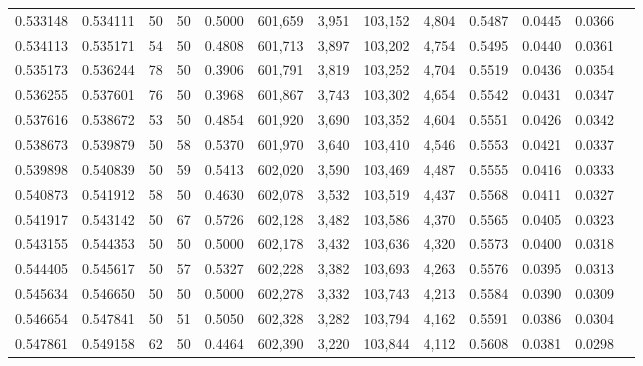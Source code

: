 \begin{tabular}{rrrrrrrrrrrrr}
0.533148 & 0.534111 &    50 &  50 &                                     0.5000 & 601,659 &   3,951 & 103,152 &   4,804 & 0.5487 & 0.0445 & 0.0366 \\
0.534113 & 0.535171 &    54 &  50 &                                     0.4808 & 601,713 &   3,897 & 103,202 &   4,754 & 0.5495 & 0.0440 & 0.0361 \\
0.535173 & 0.536244 &    78 &  50 &                                     0.3906 & 601,791 &   3,819 & 103,252 &   4,704 & 0.5519 & 0.0436 & 0.0354 \\
0.536255 & 0.537601 &    76 &  50 &                                     0.3968 & 601,867 &   3,743 & 103,302 &   4,654 & 0.5542 & 0.0431 & 0.0347 \\
0.537616 & 0.538672 &    53 &  50 &                                     0.4854 & 601,920 &   3,690 & 103,352 &   4,604 & 0.5551 & 0.0426 & 0.0342 \\
0.538673 & 0.539879 &    50 &  58 &                                     0.5370 & 601,970 &   3,640 & 103,410 &   4,546 & 0.5553 & 0.0421 & 0.0337 \\
0.539898 & 0.540839 &    50 &  59 &                                     0.5413 & 602,020 &   3,590 & 103,469 &   4,487 & 0.5555 & 0.0416 & 0.0333 \\
0.540873 & 0.541912 &    58 &  50 &                                     0.4630 & 602,078 &   3,532 & 103,519 &   4,437 & 0.5568 & 0.0411 & 0.0327 \\
0.541917 & 0.543142 &    50 &  67 &                                     0.5726 & 602,128 &   3,482 & 103,586 &   4,370 & 0.5565 & 0.0405 & 0.0323 \\
0.543155 & 0.544353 &    50 &  50 &                                     0.5000 & 602,178 &   3,432 & 103,636 &   4,320 & 0.5573 & 0.0400 & 0.0318 \\
0.544405 & 0.545617 &    50 &  57 &                                     0.5327 & 602,228 &   3,382 & 103,693 &   4,263 & 0.5576 & 0.0395 & 0.0313 \\
0.545634 & 0.546650 &    50 &  50 &                                     0.5000 & 602,278 &   3,332 & 103,743 &   4,213 & 0.5584 & 0.0390 & 0.0309 \\
0.546654 & 0.547841 &    50 &  51 &                                     0.5050 & 602,328 &   3,282 & 103,794 &   4,162 & 0.5591 & 0.0386 & 0.0304 \\
0.547861 & 0.549158 &    62 &  50 &                                     0.4464 & 602,390 &   3,220 & 103,844 &   4,112 & 0.5608 & 0.0381 & 0.0298 \\

\end{tabular}
